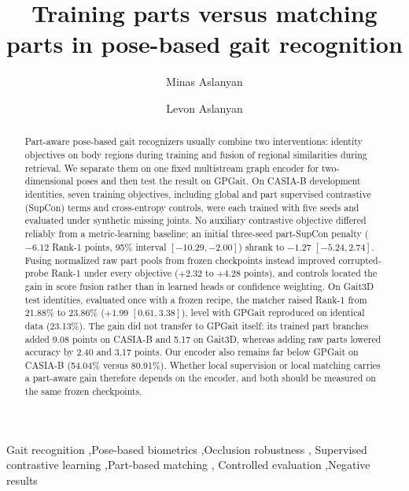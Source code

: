 \documentclass[review,12pt]{elsarticle}
\begin{document}
\begin{frontmatter}

\title{Training parts versus matching parts in pose-based gait recognition}

\author[iiap]{Minas Aslanyan}
\author[iiap]{Levon Aslanyan}

\begin{abstract}
Part-aware pose-based gait recognizers usually combine two interventions:
identity objectives on body regions during training and fusion of regional
similarities during retrieval. We separate them on one fixed multistream graph
encoder for two-dimensional poses and then test the result on GPGait. On
CASIA-B development identities, seven training objectives, including global
and part supervised contrastive (SupCon) terms and cross-entropy controls, were
each trained with five seeds and evaluated under synthetic missing joints. No
auxiliary contrastive objective differed reliably from a metric-learning
baseline; an initial three-seed part-SupCon penalty ($-6.12$ Rank-1 points,
95\% interval $[-10.29,-2.00]$) shrank to $-1.27$ $[-5.24,2.74]$. Fusing
normalized raw part pools from frozen checkpoints instead improved
corrupted-probe Rank-1 under every objective ($+2.32$ to $+4.28$ points), and
controls located the gain in score fusion rather than in learned heads or
confidence weighting. On Gait3D test identities, evaluated once with a frozen
recipe, the matcher raised Rank-1 from 21.88\% to 23.86\% ($+1.99$
$[0.61,3.38]$), level with GPGait reproduced on identical data (23.13\%). The
gain did not transfer to GPGait itself: its trained part branches added 9.08
points on CASIA-B and 5.17 on Gait3D, whereas adding raw parts lowered accuracy
by 2.40 and 3.17 points. Our encoder also remains far below GPGait on CASIA-B
(54.04\% versus 80.91\%). Whether local supervision or local matching carries a
part-aware gain therefore depends on the encoder, and both should be measured
on the same frozen checkpoints.
\end{abstract}

\begin{keyword}
Gait recognition \sep Pose-based biometrics \sep Occlusion robustness \sep
Supervised contrastive learning \sep Part-based matching \sep
Controlled evaluation \sep Negative results
\end{keyword}

\end{frontmatter}
\end{document}
